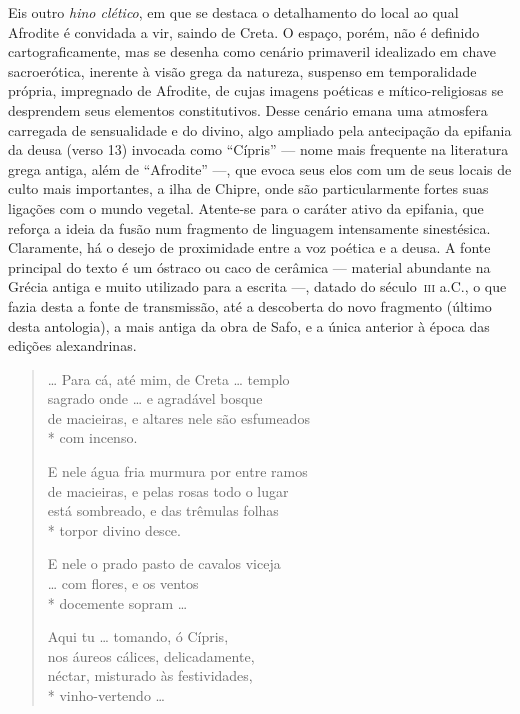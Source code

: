{\small Eis outro \textit{hino clético}, em que se destaca o detalhamento do local ao
qual Afrodite é convidada a vir, saindo de Creta. O espaço, porém, não é
definido cartograficamente, mas se desenha como cenário primaveril idealizado
em chave sacroerótica, inerente à visão grega da natureza, suspenso em
temporalidade própria, impregnado de Afrodite, de cujas imagens poéticas e
mítico-religiosas se desprendem seus elementos constitutivos. Desse cenário
emana uma atmosfera carregada de sensualidade e do divino, algo ampliado pela
antecipação da epifania da deusa (verso 13) invocada como ``Cípris'' ---
nome mais frequente na literatura grega antiga, além de “Afrodite” ---, que evoca
seus elos com um de seus locais de culto mais importantes, a ilha de Chipre,
onde são particularmente fortes suas ligações com o mundo vegetal. Atente-se
para o caráter ativo da epifania, que reforça a ideia da fusão num fragmento de
linguagem intensamente sinestésica. Claramente, há o desejo de proximidade
entre a voz poética e a deusa. A fonte principal do texto é um óstraco ou caco
de cerâmica --- material abundante na Grécia antiga e muito utilizado para a
escrita ---, datado do século~\textsc{iii} a.C., o que fazia desta a fonte de transmissão, 
até a descoberta do novo fragmento (último desta antologia), a mais antiga da obra de Safo, e a
única anterior à época das edições alexandrinas.}

\begin{verse}
\ldots{} Para cá, até mim, de Creta \ldots{} templo\\
sagrado onde \ldots{} e agradável bosque\\
de macieiras, e altares nele são esfumeados\\*
com incenso.

E nele água fria murmura por entre ramos\\
de macieiras, e pelas rosas todo o lugar\\
está sombreado, e das trêmulas folhas\\*
torpor divino desce.

E nele o prado pasto de cavalos viceja\\
\ldots{} com flores, e os ventos\\*
docemente sopram \ldots{}

Aqui tu \ldots{} tomando, ó Cípris,\\
nos áureos cálices, delicadamente,\\
néctar, misturado às festividades,\\*
vinho-vertendo \ldots{}
\end{verse}

